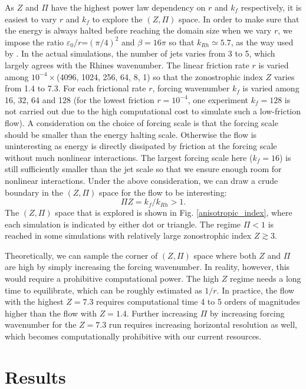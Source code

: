 \documentclass{ametsoc}
\begin{document}
As $Z$ and $\Pi$ have the highest power law dependency on $r$ and
$k_{f}$ respectively, it is easiest to vary $r$ and $k_{f}$ to
explore the $(Z,\Pi)$ space. In order to make sure that the energy is
always halted before reaching the domain size when we vary $r$, we impose
the ratio $\varepsilon_{0}/r$=$(\pi/4)^{2}$ and $\beta=16\pi$ so
that $k_{Rh}\simeq5.7$, as the way used by \citet{Scott2012}. In
the actual simulations, the number of jets varies from 3 to 5, which
largely agrees with the Rhines wavenumber. The linear friction rate
$r$ is varied among $10^{-4}\times$(4096, 1024, 256, 64, 8, 1) so
that the zonostrophic index $Z$ varies from 1.4 to 7.3. For each frictional
rate $r$, forcing wavenumber $k_{f}$ is varied among 16, 32, 64
and 128 (for the lowest friction $r=10^{-4}$, one experiment $k_{f}=128$
is not carried out due to the high computational cost to simulate
such a low-friction flow). A consideration
on the choice of forcing scale is that the forcing scale should be
smaller than the energy halting scale. Otherwise the flow is
uninteresting as energy is directly dissipated by friction at the
forcing scale without much nonlinear interactions.
The largest forcing scale here ($k_{f}=16$) is
still sufficiently smaller than the jet scale so that we ensure
enough room for nonlinear interactions. Under the above consideration,
we can draw a crude boundary in the $(Z,\Pi)$ space
for the flow to be interesting:
\begin{equation}
\Pi Z=k_{f}/k_{Rh}>1.\label{eq:PIxZ>1}
\end{equation}
The $(Z,\Pi)$ space that is explored is shown in Fig. \ref{anisotropic_index},
where each simulation is indicated by either dot or triangle. The
regime $\Pi<1$ is reached in some simulations with relatively large
zonostrophic index $Z\apprge3$. 

Theoretically, we can sample the corner of $(Z,\Pi)$ space where
both $Z$ and $\Pi$ are high by simply increasing the forcing wavenumber.
In reality, however, this would require a prohibitive computational
power. The high $Z$ regime needs a long time to equilibrate, which
can be roughly estimated as $1/r$. In practice, the flow with the
highest $Z=7.3$ requires computational time 4 to 5 orders of magnitudes
higher than the flow with $Z=1.4$. Further increasing $\Pi$ by increasing
forcing wavenumber for the $Z=7.3$ run requires increasing horizontal
resolution as well, which becomes computationally prohibitive with
our current resources.


\section{Results}
\end{document}
